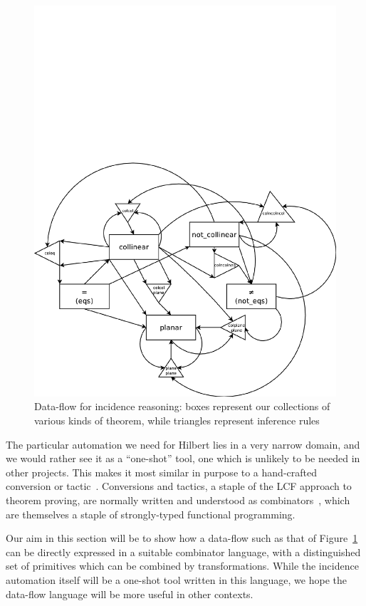 \begin{figure}
\centering\includegraphics[scale=0.5]{automation/DataFlow}
\caption{Data-flow for incidence reasoning: boxes represent our collections of various kinds of theorem, while triangles represent inference rules}
\label{fig:DataFlow}
\end{figure}

The particular automation we need for Hilbert lies in a very narrow domain, and we would rather see it as a  ``one-shot'' tool, one which is unlikely to be needed in other projects. This makes it most similar in purpose to a hand-crafted conversion or tactic~\cite{Tactics}. Conversions and tactics, a staple of the LCF approach to theorem proving, are normally written and understood as combinators~\cite{CombinatorLanguages}, which are themselves a staple of strongly-typed functional programming. 

Our aim in this section will be to show how a data-flow such as that of Figure~\ref{fig:DataFlow} can be directly expressed in a suitable combinator language, with a distinguished set of primitives which can be combined by transformations. While the incidence automation itself will be a one-shot tool written in this language, we hope the data-flow language will be more useful in other contexts.

